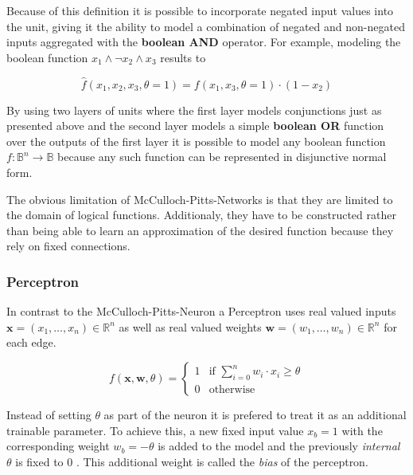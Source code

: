 Because of this definition it is possible to incorporate negated input values into the unit, giving it the ability to model a combination of negated and non-negated inputs aggregated with the \textbf{boolean AND} operator.
For example, modeling the boolean function $x_1 \wedge \neg x_2 \wedge x_3$ results to 

\begin{equation}
    \hat{f}(x_1, x_2, x_3, \theta=1) = f(x_1, x_3, \theta=1) \cdot (1 - x_2)
\end{equation}

By using two layers of units where the first layer models conjunctions just as presented above and the second layer models a simple \textbf{boolean OR} function over the outputs of the first layer it is possible to model any boolean function $f: \mathbb{B}^n \to \mathbb{B}$ because any such function can be represented in disjunctive normal form.

The obvious limitation of McCulloch-Pitts-Networks is that they are limited to the domain of logical functions.
Additionaly, they have to be constructed rather than being able to learn an approximation of the desired function because they rely on fixed connections.



\subsubsection{Perceptron}

In contrast to the McCulloch-Pitts-Neuron a Perceptron uses real valued inputs $\bm{x} = (x_1, \dots, x_n) \in \mathbb{R}^n$ as well as real valued weights $\bm{w} = (w_1, \dots, w_n) \in \mathbb{R}^n$ for each edge.

\begin{equation}
    f(\bm{x}, \bm{w}, \theta) = 
    \begin{cases}
        1 & \text{if } \sum_{i=0}^n w_i \cdot x_i \geq \theta \\
        0 & \text{otherwise}
    \end{cases}    
\end{equation}

Instead of setting $\theta$ as part of the neuron it is prefered to treat it as an additional trainable parameter.
To achieve this, a new fixed input value $x_b = 1$ with the corresponding weight $w_b = -\theta$ is added to the model and the previously \emph{internal} $\theta$ is fixed to $0$ .
This additional weight is called the \textit{bias} of the perceptron.

